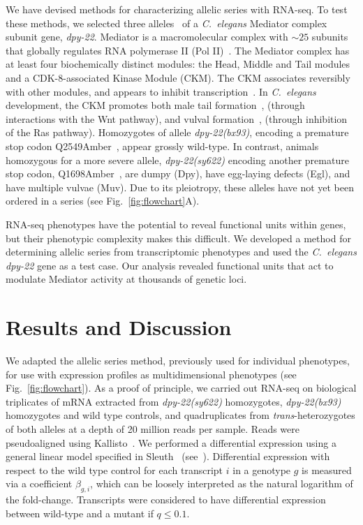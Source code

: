 \documentclass[8pt, twocolumn]{article}
\newcommand{\cel}{\emph{C.~elegans}}
\newcommand{\gene}[1]{\mbox{\emph{#1}}}
\newcommand{\dpy}[1]{\gene{dpy-22#1}}
\newcommand{\bx}{\dpy{(bx93)}}
\newcommand{\sy}{\dpy{(sy622)}}
\begin{document}
We have devised methods for characterizing allelic series with RNA-seq. To test
these methods, we selected three alleles~\cite{Zhang2000,Moghal2003} of a \cel{}
Mediator complex subunit gene, \dpy{}. Mediator is a macromolecular complex with
$\sim25$ subunits~\cite{Jeronimo2017} that globally regulates RNA polymerase II
(Pol II)~\cite{Allen2015,Takagi2006}. The Mediator complex has at least four
biochemically distinct modules: the Head, Middle and Tail modules and a
CDK-8-associated Kinase Module (CKM). The CKM associates reversibly with other
modules, and appears to inhibit transcription~\cite{Knuesel2009,Elmlund2006}. In
\cel{} development, the CKM promotes both male tail formation~\cite{Zhang2000},
(through interactions with the Wnt pathway), and vulval
formation~\cite{Moghal2003a}, (through inhibition of the Ras pathway).
Homozygotes of allele \gene{dpy-22(bx93)}, encoding a premature stop codon
Q2549Amber~\cite{Zhang2000}, appear grossly wild-type. In contrast, animals
homozygous for a more severe allele, \gene{dpy-22(sy622)} encoding another
premature stop codon, Q1698Amber~\cite{Moghal2003}, are dumpy (Dpy), have
egg-laying defects (Egl), and have multiple vulvae (Muv). Due to its pleiotropy,
these alleles have not yet been ordered in a series (see
Fig.~\ref{fig:flowchart}A).

RNA-seq phenotypes have the potential to reveal functional units within genes,
but their phenotypic complexity makes this difficult. We developed a
method for determining allelic series from transcriptomic phenotypes and used
the \cel{} \dpy{} gene as a test case. Our analysis revealed functional units
that act to modulate Mediator activity at thousands of genetic loci.


\section*{Results and Discussion}
We adapted the allelic series method, previously used for individual phenotypes,
for use with expression profiles as multidimensional phenotypes (see
Fig.~\ref{fig:flowchart}). As a proof of principle, we carried out RNA-seq on
biological triplicates of mRNA extracted from \sy{} homozygotes, \bx{}
homozygotes and wild type controls, and quadruplicates from
\emph{trans}-heterozygotes of both alleles at a depth of 20 million reads per
sample. Reads were pseudoaligned using Kallisto~\cite{Bray2016}. We performed a
differential expression using a general linear model specified in
Sleuth~\cite{Pimentel2016a} (see~). Differential expression
with respect to the wild type control for each transcript $i$ in a genotype $g$
is measured via a coefficient $\beta_{g, i}$, which can be loosely interpreted
as the natural logarithm of the fold-change. Transcripts were considered to have
differential expression between wild-type and a mutant if $q\leq 0.1$.
\end{document}
